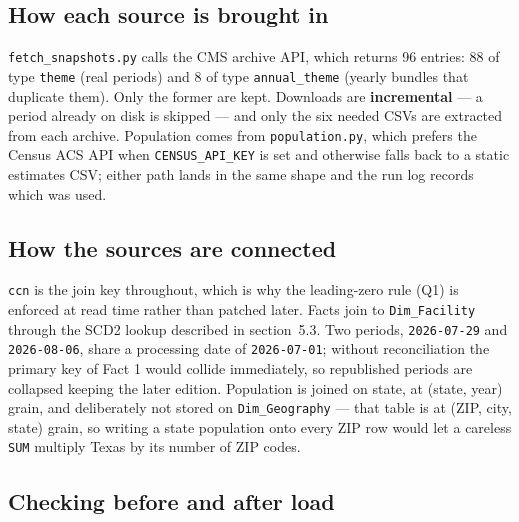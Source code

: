 \documentclass[11pt,a4paper]{article}
\newcommand{\code}[1]{\texttt{#1}}
\begin{document}
\subsection{How each source is brought in}

\code{fetch\_snapshots.py} calls the CMS archive API, which returns 96 entries:
88 of type \code{theme} (real periods) and 8 of type \code{annual\_theme}
(yearly bundles that duplicate them). Only the former are kept. Downloads are
\textbf{incremental} — a period already on disk is skipped — and only the six
needed CSVs are extracted from each archive. Population comes from
\code{population.py}, which prefers the Census ACS API when
\code{CENSUS\_API\_KEY} is set and otherwise falls back to a static estimates
CSV; either path lands in the same shape and the run log records which was used.

\subsection{How the sources are connected}

\code{ccn} is the join key throughout, which is why the leading-zero rule (Q1)
is enforced at read time rather than patched later. Facts join to
\code{Dim\_Facility} through the SCD2 lookup described in section~5.3. Two
periods, \code{2026-07-29} and \code{2026-08-06}, share a processing date of
\code{2026-07-01}; without reconciliation the primary key of Fact 1 would
collide immediately, so republished periods are collapsed keeping the later
edition. Population is joined on state, at (state, year) grain, and deliberately
not stored on \code{Dim\_Geography} — that table is at (ZIP, city, state) grain,
so writing a state population onto every ZIP row would let a careless
\code{SUM} multiply Texas by its number of ZIP codes.

\subsection{Checking before and after load}
\end{document}
